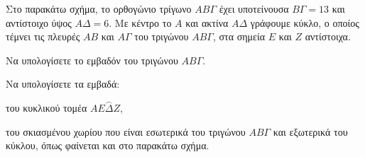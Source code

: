 Στο παρακάτω σχήμα, το ορθογώνιο τρίγωνο $AB\Gamma$ έχει υποτείνουσα $B\Gamma = 13$ και αντίστοιχο ύψος $A\Delta = 6$. Με κέντρο το $A$ και ακτίνα $A\Delta$ γράφουμε κύκλο, ο οποίος τέμνει τις πλευρές $AB$ και $A\Gamma$ του τριγώνου $AB\Gamma$, στα σημεία $E$ και $Z$ αντίστοιχα.
\begin{alist}
    \item Να υπολογίσετε το εμβαδόν του τριγώνου $AB\Gamma$. 
    \item Να υπολογίσετε τα εμβαδά:
    \begin{rlist}
        \item του κυκλικού τομέα $A\overset{\frown}{E\Delta Z}$, 
        \item του σκιασμένου χωρίου που είναι εσωτερικά του τριγώνου $AB\Gamma$ και εξωτερικά του κύκλου, όπως φαίνεται και στο παρακάτω σχήμα. 
    \end{rlist}
\end{alist}